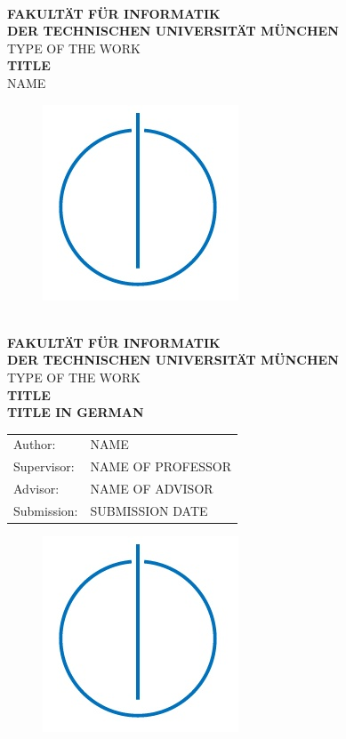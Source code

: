 \documentclass[a4paper]{article}
\begin{document}
\thispagestyle{empty}
\begin{center}
	\bigskip \bigskip \bigskip 
	\oTUM{4.0cm} \\
	\vspace*{1cm}
	{ \bf FAKULTÄT FÜR INFORMATIK} \\
	{ \bf DER TECHNISCHEN UNIVERSITÄT MÜNCHEN} \\
	\bigskip \bigskip \bigskip \bigskip \bigskip
	{ TYPE OF THE WORK} \\
	\bigskip \bigskip \bigskip \bigskip \bigskip
	\bigskip \bigskip \bigskip \bigskip \bigskip
	{\Large \bf TITLE} \\        
	\bigskip \bigskip \bigskip \bigskip
	{\Large NAME} \\    
	\bigskip\bigskip \bigskip \bigskip
	\begin{figure}[ht]
	\centering \includegraphics[width=0.2\linewidth]{infologo.jpg}
	\end{figure}
	\bigskip 
\end{center}
\vfill

\newpage
\thispagestyle{empty}
\begin{center}
	\bigskip \bigskip \bigskip 
	\oTUM{4.0cm} \\
	\vspace*{1cm}
	{ \bf FAKULTÄT FÜR INFORMATIK} \\
	{ \bf DER TECHNISCHEN UNIVERSITÄT MÜNCHEN} \\
	\bigskip \bigskip \bigskip
	{TYPE OF THE WORK} \\
	\bigskip \bigskip \bigskip
	{\Large \bf TITLE} \\        
	\bigskip \bigskip \bigskip
	{\Large \bf TITLE IN GERMAN} \\
	\bigskip \bigskip \bigskip
\end{center}
\begin{table}
\centering
\begin{tabular}{ll}
{Author:} & {NAME} \\
{Supervisor:} & {NAME OF PROFESSOR} \\
{Advisor:} & {NAME OF ADVISOR} \\
{Submission:} & {SUBMISSION DATE} \\
\end{tabular}
\end{table}
\begin{figure}[ht]
	\centering \includegraphics[width=0.2\linewidth]{infologo.jpg}
\end{figure}
\vfill
\end{document}
